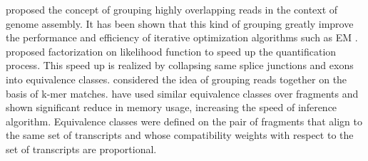 \citet{pop2004} proposed the concept of grouping highly overlapping reads in the context of genome assembly. It has been shown that this kind of grouping greatly improve the performance and efficiency of iterative optimization algorithms such as EM \citep{sailfish}. \citet{salzman2011statistical} proposed factorization on likelihood function to speed up the quantification process. This speed up is realized by collapsing same splice junctions and exons into equivalence classes.
\citet{Salmela2011} considered the idea of grouping reads together on the basis of k-mer matches. \citet{isoem} have used similar equivalence classes over fragments and shown significant reduce in memory usage, increasing the speed of inference algorithm. Equivalence classes were defined on the pair of fragments that align to the same set of transcripts and whose compatibility weights with respect to the set of transcripts are proportional.  





